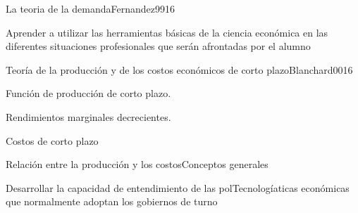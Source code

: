\begin{syllabus}
\begin{unit}{La teoria de la demanda}{Fernandez99}{16}
\begin{unitgoals}
      \item Aprender a utilizar las herramientas básicas de la ciencia económica en las diferentes situaciones profesionales que serán afrontadas por el alumno
   \end{unitgoals}
\end{unit}


\begin{unit}{Teoría de la producción y de los costos económicos de corto plazo}{Blanchard00}{16}
\begin{topics}
	\item Función de producción de corto plazo.
	\item Rendimientos marginales decrecientes.
	\item Costos de corto plazo
	\item Relación entre la producción y los costosConceptos generales
\end{topics}

\begin{unitgoals}
      \item Desarrollar la capacidad de entendimiento de las polTecnologíaticas económicas que normalmente adoptan los gobiernos de turno
   \end{unitgoals}
\end{unit}

\begin{coursebibliography}
\end{coursebibliography}
\end{syllabus}





